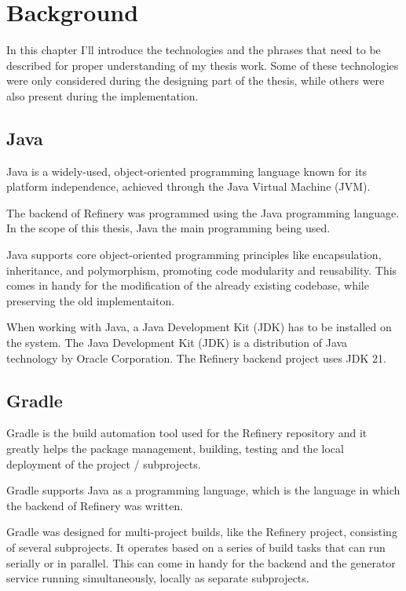 \chapter{Background} \label{Background}
In this chapter I'll introduce the technologies and the phrases that need to be described for proper understanding of my thesis work.
Some of these technologies were only considered during the designing part of the thesis, while others were also present 
during the implementation.

\section{Java}
	Java \cite{java} is a widely-used, object-oriented programming language known for its platform independence, achieved through the Java Virtual Machine (JVM). 

	The backend of Refinery was programmed using the Java programming language. In the scope of this thesis, Java the main programming being used.

	Java supports core object-oriented programming principles like encapsulation, inheritance, and polymorphism, promoting code modularity and reusability.
	This comes in handy for the modification of the already existing codebase, while preserving the old implementaiton.

	When working with Java, a Java Development Kit (JDK) has to be installed on the system.
	The Java Development Kit (JDK) is a distribution of Java technology by Oracle Corporation. 
	The Refinery backend project uses JDK 21.

\section{Gradle}
	Gradle \cite{gradle} is the build automation tool used for the Refinery repository and it greatly helps the package management, 
	building, testing and the local deployment of the project / subprojects.

	Gradle supports Java as a programming language, which is the language in which the backend of Refinery was written.

	Gradle was designed for multi-project builds, like the Refinery project, consisting of several subprojects. 
	It operates based on a series of build tasks that can run serially or in parallel. This can come in handy for the backend and the generator service 
	running simultaneously, locally as separate subprojects.

